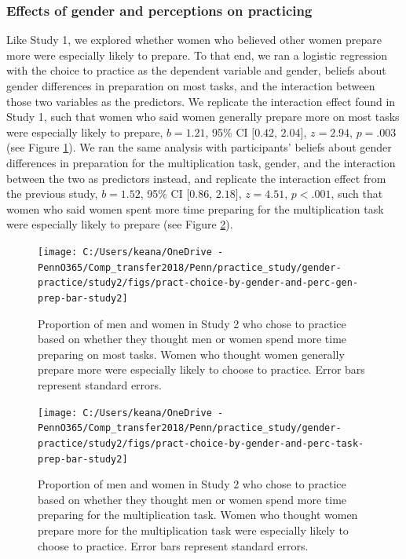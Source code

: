 \documentclass[a4paper, nobind]{templates/ociamthesis}
\begin{document}
\hypertarget{effects-of-gender-and-perceptions-on-practicing-2}{%
\subsubsection{Effects of gender and perceptions on practicing}\label{effects-of-gender-and-perceptions-on-practicing-2}}

Like Study 1, we explored whether women who believed other women prepare more were especially likely to prepare. To that end, we ran a logistic regression with the choice to practice as the dependent variable and gender, beliefs about gender differences in preparation on most tasks, and the interaction between those two variables as the predictors. We replicate the interaction effect found in Study 1, such that women who said women generally prepare more on most tasks were especially likely to prepare, \(b = 1.21\), 95\% CI \([0.42\), \(2.04]\), \(z = 2.94\), \(p = .003\) (see Figure \ref{fig:pract-choice-by-gender-and-perc-gen-prep-bar-study2}). We ran the same analysis with participants' beliefs about gender differences in preparation for the multiplication task, gender, and the interaction between the two as predictors instead, and replicate the interaction effect from the previous study, \(b = 1.52\), 95\% CI \([0.86\), \(2.18]\), \(z = 4.51\), \(p < .001\), such that women who said women spent more time preparing for the multiplication task were especially likely to prepare (see Figure \ref{fig:pract-choice-by-gender-and-perc-task-prep-bar-study2}).

\begin{figure}

{\centering \texttt{[image: C:/Users/keana/OneDrive - PennO365/Comp\_transfer2018/Penn/practice\_study/gender-practice/study2/figs/pract-choice-by-gender-and-perc-gen-prep-bar-study2]} 

}

\caption{Proportion of men and women in Study 2 who chose to practice based on whether they thought men or women spend more time preparing on most tasks. Women who thought women generally prepare more were especially likely to choose to practice. Error bars represent standard errors.}\label{fig:pract-choice-by-gender-and-perc-gen-prep-bar-study2}
\end{figure}

\begin{figure}

{\centering \texttt{[image: C:/Users/keana/OneDrive - PennO365/Comp\_transfer2018/Penn/practice\_study/gender-practice/study2/figs/pract-choice-by-gender-and-perc-task-prep-bar-study2]} 

}

\caption{Proportion of men and women in Study 2 who chose to practice based on whether they thought men or women spend more time preparing for the multiplication task. Women who thought women prepare more for the multiplication task were especially likely to choose to practice. Error bars represent standard errors.}\label{fig:pract-choice-by-gender-and-perc-task-prep-bar-study2}
\end{figure}
\end{document}

